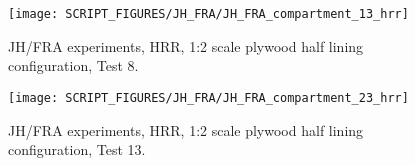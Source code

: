 
\begin{figure}[h!]
\texttt{[image: SCRIPT\_FIGURES/JH\_FRA/JH\_FRA\_compartment\_13\_hrr]}
\caption[JH/FRA experiments, HRR, 1:2 scale plywood half lining configuration, Test 8]{JH/FRA experiments, HRR, 1:2 scale plywood half lining configuration, Test 8.}
\label{JH_FRA_plywood_02}
\end{figure}


\begin{figure}[h!]
\texttt{[image: SCRIPT\_FIGURES/JH\_FRA/JH\_FRA\_compartment\_23\_hrr]}
\caption[JH/FRA experiments, HRR, 1:1 scale plywood half lining configuration, Test 13]{JH/FRA experiments, HRR, 1:2 scale plywood half lining configuration, Test 13.}
\label{JH_FRA_plywood_03}
\end{figure}


